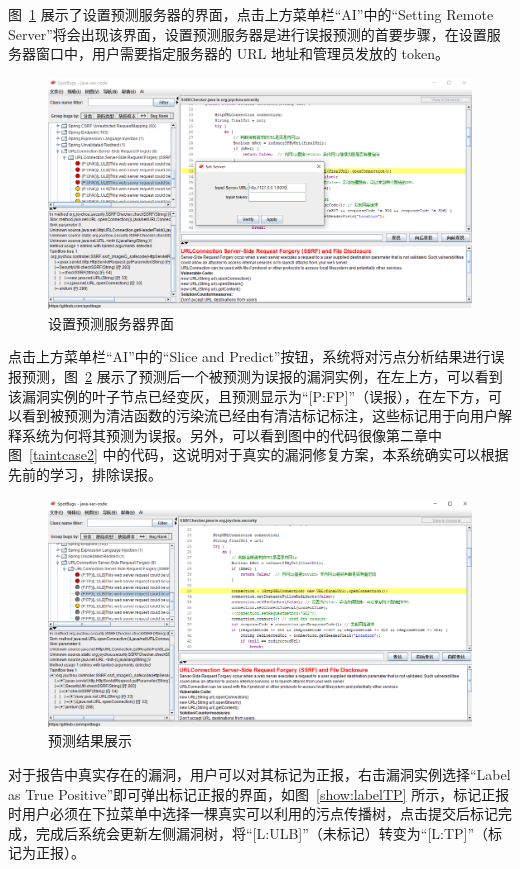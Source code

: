 图~\ref{show:settingServer} 展示了设置预测服务器的界面，点击上方菜单栏“AI”中的“Setting Remote Server”将会出现该界面，设置预测服务器是进行误报预测的首要步骤，在设置服务器窗口中，用户需要指定服务器的 URL 地址和管理员发放的 token。

 \begin{figure}[!htbp]
     \centering
     \includegraphics[width=0.8\linewidth]{FIGs/chapter4/settingServer.png}
     \caption{设置预测服务器界面}\label{show:settingServer}
 \end{figure} 

点击上方菜单栏“AI”中的“Slice and Predict”按钮，系统将对污点分析结果进行误报预测，图~\ref{show:predictResult} 展示了预测后一个被预测为误报的漏洞实例，在左上方，可以看到该漏洞实例的叶子节点已经变灰，且预测显示为“[P:FP]”（误报），在左下方，可以看到被预测为清洁函数的污染流已经由有清洁标记标注，这些标记用于向用户解释系统为何将其预测为误报。另外，可以看到图中的代码很像第二章中图~\ref{taintcase2} 中的代码，这说明对于真实的漏洞修复方案，本系统确实可以根据先前的学习，排除误报。

\begin{figure}[!htbp]
    \centering
    \includegraphics[width=0.8\linewidth]{FIGs/chapter4/predictResult.png}
    \caption{预测结果展示}\label{show:predictResult}
\end{figure}

对于报告中真实存在的漏洞，用户可以对其标记为正报，右击漏洞实例选择“Label as True Positive”即可弹出标记正报的界面，如图~\ref{show:labelTP} 所示，标记正报时用户必须在下拉菜单中选择一棵真实可以利用的污点传播树，点击提交后标记完成，完成后系统会更新左侧漏洞树，将“[L:ULB]”（未标记）转变为“[L:TP]”（标记为正报）。


